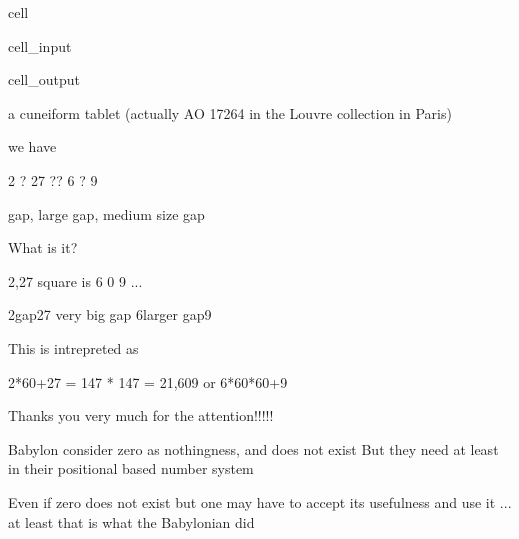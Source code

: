 \documentclass[letterpaper,10pt,english]{jupyterBook}
\begin{document}
\begin{sphinxuseclass}{cell}\begin{sphinxVerbatimInput}

\begin{sphinxuseclass}{cell_input}
\begin{sphinxVerbatim}[commandchars=\\\{\}]
\end{sphinxVerbatim}

\end{sphinxuseclass}\end{sphinxVerbatimInput}
\begin{sphinxVerbatimOutput}

\begin{sphinxuseclass}{cell_output}
\noindent{}

\end{sphinxuseclass}\end{sphinxVerbatimOutput}

\end{sphinxuseclass}
\begin{sphinxVerbatim}[commandchars=\\\{\}]
\PYGZdq{}a cuneiform tablet (actually AO 17264 in the Louvre collection in Paris)\PYGZdq{}

we have

    2 ? 27    ??         6      ?          9  

     gap,   large gap,    medium size gap 
     
What is it?

    2,27 square is 6 \PYGZlt{}0\PYGZgt{} 9 ...

    2\PYGZlt{}gap\PYGZgt{}27  \PYGZlt{}very big gap\PYGZgt{}   6\PYGZlt{}larger gap\PYGZgt{}9
    
    
    
This is intrepreted as 

2*60+27 = 147 * 147 = 21,609 or 6*60*60+9 

Thanks you very much for the attention!!!!!
\end{sphinxVerbatim}

\begin{sphinxVerbatim}[commandchars=\\\{\}]
Babylon consider zero as nothingness, and does not exist
But they need at least in their positional based number system

Even if zero does not exist
but one may have to accept its usefulness
and use it ... at least that is what the Babylonian did
\end{sphinxVerbatim}
\end{document}
